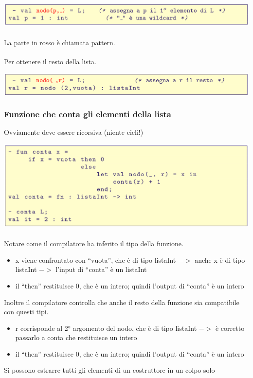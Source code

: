 \documentclass[10pt]{article}
\begin{document}
\includegraphics[scale=0.2]{Immagini/ml19.png}
\\\\
La parte in rosso è chiamata pattern.
\\\\
Per ottenere il resto della lista.

\includegraphics[scale=0.2]{Immagini/ml20.png}
\subsubsection{Funzione che conta gli elementi della lista}
Ovviamente deve essere ricorsiva (niente cicli!)

\includegraphics[scale=0.2]{Immagini/ml21.png}
\\\\
Notare come il compilatore ha inferito il tipo della funzione.
\begin{itemize}
    \item x viene confrontato con “vuota”, che è di tipo listaInt $->$ anche x è
di tipo listaInt $->$ l’input di “conta” è un listaInt
\item il “then” restituisce 0, che è un intero; quindi l’output di “conta” è
un intero
\end{itemize}
Inoltre il compilatore controlla che anche il resto della funzione
sia compatibile con questi tipi.
\begin{itemize}
    \item r corrisponde al 2° argomento del nodo, che è di tipo listaInt $->$ è
corretto passarlo a conta che restituisce un intero
\item il “then” restituisce 0, che è un intero; quindi l’output di “conta” è
un intero
\end{itemize}
Si possono estrarre tutti gli elementi di un costruttore in un colpo solo
\end{document}
